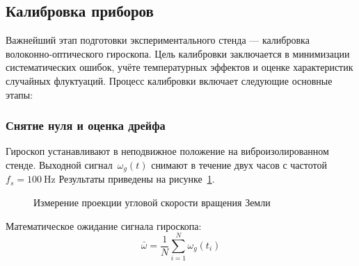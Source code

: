 \subsection{Калибровка приборов}

Важнейший этап подготовки экспериментального стенда --- калибровка волоконно-оптического гироскопа. Цель калибровки заключается в минимизации систематических ошибок, учёте температурных эффектов и оценке характеристик случайных флуктуаций. Процесс калибровки включает следующие основные этапы:

\subsubsection{Снятие нуля и оценка дрейфа}

Гироскоп устанавливают в неподвижное положение на виброизолированном стенде. Выходной сигнал~$\omega_g(t)$ снимают в течение двух часов с частотой $f_s = \SI{100}{\hertz}$
Результаты приведены на рисунке~\ref{fig:gyroEarth}.

\begin{figure}[ht]
	\caption{Измерение проекции угловой скорости вращения Земли}
	\label{fig:gyroEarth}
\end{figure}

Математическое ожидание сигнала гироскопа:
\begin{equation}
	\bar{\omega}
	= \frac{1}{N}\sum_{i=1}^{N}\omega_g(t_i)
	\label{eq:mean}
\end{equation}

